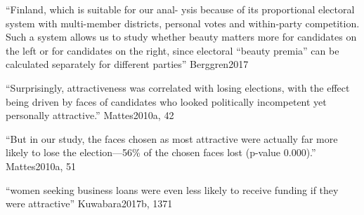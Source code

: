 ``Finland, which is suitable for our anal- ysis because of its proportional electoral system with multi-member districts, personal votes and within-party competition. Such a system allows us to study whether beauty matters more for candidates on the left or for candidates on the right, since electoral “beauty premia” can be calculated separately for different parties'' Berggren2017


``Surprisingly, attractiveness was correlated with losing elections, with the effect being driven by faces of candidates who looked politically incompetent yet personally attractive.'' Mattes2010a, 42

``But in our study, the faces chosen as most attractive were actually far more likely to lose the election—56\% of the chosen faces lost (p-value 0.000).'' Mattes2010a, 51

``women seeking business loans were even less likely to receive funding if they were attractive'' Kuwabara2017b, 1371
